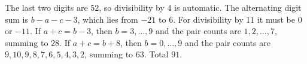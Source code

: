 The last two digits are $52$, so divisibility by $4$ is automatic. The alternating digit sum is $b-a-c-3$, which lies from $-21$ to $6$. For divisibility by $11$ it must be $0$ or $-11$. If $a+c=b-3$, then $b=3,\ldots,9$ and the pair counts are $1,2,\ldots,7$, summing to $28$. If $a+c=b+8$, then $b=0,\ldots,9$ and the pair counts are $9,10,9,8,7,6,5,4,3,2$, summing to $63$. Total $\boxed{91}$.
